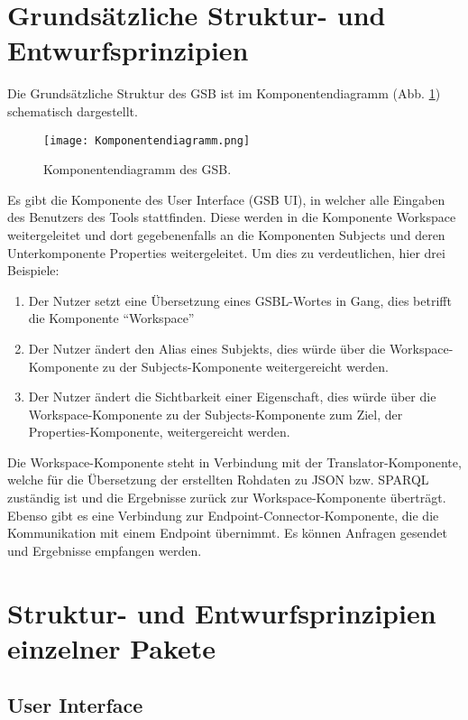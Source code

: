 \section{Grundsätzliche Struktur- und Entwurfsprinzipien}

Die Grundsätzliche Struktur des GSB ist im Komponentendiagramm
(Abb. \ref{fig02}) schematisch dargestellt.

\begin{figure}[h]%
\texttt{[image: Komponentendiagramm.png]}
\caption{Komponentendiagramm des GSB.}
\label{fig02}
\end{figure}


Es gibt die Komponente des User Interface (GSB UI), in welcher alle
Eingaben des Benutzers des Tools stattfinden. Diese werden in die
Komponente Workspace weitergeleitet und dort gegebenenfalls an die
Komponenten Subjects und deren Unterkomponente Properties
weitergeleitet. Um dies zu verdeutlichen, hier drei Beispiele:
\begin{enumerate}
\item Der Nutzer setzt eine Übersetzung eines GSBL-Wortes in Gang, dies betrifft die Komponente “Workspace”
\item Der Nutzer ändert den Alias eines Subjekts, dies würde über die Workspace-Komponente zu der Subjects-Komponente weitergereicht werden.
\item Der Nutzer ändert die Sichtbarkeit einer Eigenschaft, dies würde über die Workspace-Komponente zu der Subjects-Komponente zum Ziel, der Properties-Komponente, weitergereicht werden.
\end{enumerate}
Die Workspace-Komponente steht in Verbindung mit der
Translator-Komponente, welche für die Übersetzung der erstellten
Rohdaten zu JSON bzw. SPARQL zuständig ist und die Ergebnisse zurück
zur Workspace-Komponente überträgt.
Ebenso gibt es eine Verbindung zur Endpoint-Connector-Komponente, die die Kommunikation mit einem Endpoint übernimmt. Es können Anfragen gesendet und Ergebnisse empfangen werden.



\section{Struktur- und Entwurfsprinzipien einzelner Pakete}

\subsection*{User Interface}

